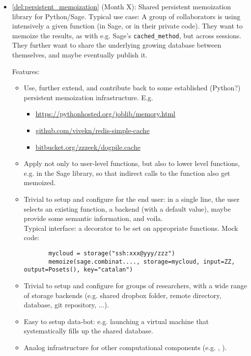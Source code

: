 \begin{Workpackage}{\thewpno}
\begin{WPDeliverables}
\begin{itemize}
\item {}

  \ref{del:persistent_memoization} (Month X): Shared persistent
  memoization library for Python/Sage.  Typical use case: A group of
  collaborators is using intensively a given function (in Sage, or in
  their private code). They want to memoize the results, as with
  e.g. Sage's \lstinline{cached_method}, but across sessions.  They
  further want to share the underlying growing database between
  themselves, and maybe eventually publish it.

  Features:
  \begin{itemize}
  \item Use, further extend, and contribute back to some established
    (Python?) persistent memoization infrastructure. E.g.
    \begin{itemize}
    \item \url{https://pythonhosted.org/joblib/memory.html}
    \item \url{github.com/vivekn/redis-simple-cache}
    \item \url{bitbucket.org/zzzeek/dogpile.cache}
    \end{itemize}
  \item Apply not only to user-level functions, but also to lower
    level functions, e.g. in the Sage library, so that indirect calls
    to the function also get memoized.
  \item Trivial to setup and configure for the end user: in a single
    line, the user selects an existing function, a backend (with a
    default value), maybe provide some semantic information, and
    voila. \\
    Typical interface: a decorator to be set on appropriate functions.
    Mock code:
    \begin{lstlisting}
       mycloud = storage("ssh:xxx@yyy/zzz")
       memoize(sage.combinat...., storage=mycloud, input=ZZ, output=Posets(), key="catalan")
    \end{lstlisting}
     \item Trivial to setup and configure for groups of researchers, with
    a wide range of storage backends (e.g. shared dropbox folder,
    remote directory, database, git repository, ...).
  \item Easy to setup data-bot: e.g. launching a virtual machine that
    systematically fills up the shared database.
  \item Analog infrastructure for other computational components
    (e.g. \GAP, \Singular).

\end{itemize}
\end{itemize}
\end{WPDeliverables}
\end{Workpackage}
